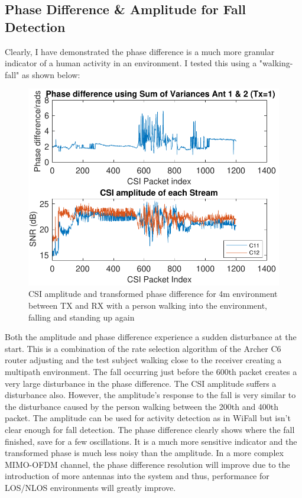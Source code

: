 \subsection{Phase Difference \& Amplitude for Fall Detection}
Clearly, I have demonstrated the phase difference is a much more granular indicator of a human activity in an environment. I tested this using a "walking-fall" as shown below:
\begin{figure}[H]
    \centering
    \includegraphics[scale=0.75]{Figures/subplotFall.pdf}
    \caption{CSI amplitude and transformed phase difference for 4m environment between TX and RX with a person walking into the environment, falling and standing up again}
    \label{fig:finalPlot}
\end{figure}
Both the amplitude and phase difference experience a sudden disturbance at the start. This is a combination of the rate selection algorithm of the Archer C6 router adjusting and the test subject walking close to the receiver creating a multipath environment. The fall occurring just before the 600th packet creates a very large disturbance in the phase difference. The CSI amplitude suffers a disturbance also. However, the amplitude's response to the fall is very similar to the disturbance caused by the person walking between the 200th and 400th packet. The amplitude can be used for activity detection as in WiFall but isn't clear enough for fall detection. The phase difference clearly shows where the fall finished, save for a few oscillations. It is a much more sensitive indicator and the transformed phase is much less noisy than the amplitude. In a more complex MIMO-OFDM channel, the phase difference resolution will improve due to the introduction of more antennas into the system and thus, performance for LOS/NLOS environments will greatly improve.